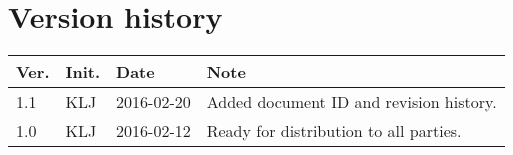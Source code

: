 \chapter*{Version history}
\label{app:rev_his}


\begin{tabular}{b{1cm} b{1cm} b{2cm} b{8cm}}
    \textbf{Ver.} & \textbf{Init.} & \textbf{Date} & \textbf{Note} \\
    \hline
    1.1 & KLJ & 2016-02-20 & Added document ID and revision history. \\
    1.0 & KLJ & 2016-02-12 & Ready for distribution to all parties. \\
\end{tabular}
